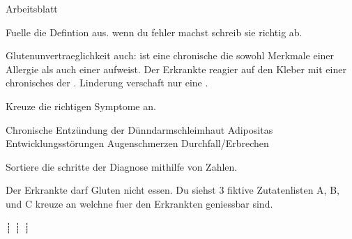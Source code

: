 \documentclass[11pt,twoside,a4paper]{exam}
\begin{document}
\begin{center}
  \huge{Arbeitsblatt}
\end{center}
\begin{center}
\end{center}
\vspace{0.1in}

\begin{questions}
\question Fuelle die Defintion aus. wenn du fehler machst schreib sie richtig ab.

Glutenunvertraeglichkeit auch: \fillin ist eine chronische \fillin die sowohl Merkmale einer Allergie als auch einer \fillin aufweist.
Der Erkrankte reagier \fillin auf den Kleber \fillin mit einer chronisches \fillin der \fillin. Linderung verschaft
nur eine \fillin.



\question
  Kreuze die richtigen Symptome an.
  \begin{checkboxes}
\choice Chronische Entzündung der Dünndarmschleimhaut
\choice Adipositas
\choice Entwicklungsstörungen
\choice Augenschmerzen
\choice Durchfall/Erbrechen
  \end{checkboxes}



  \question Sortiere die schritte der Diagnose mithilfe von Zahlen.
  
  \begin{oneparcheckboxes}
  \end{oneparcheckboxes}


\begin{center}
\end{center}

\vspace{0.1in}

  \question Der Erkrankte darf Gluten nicht essen. Du siehst 3 fiktive Zutatenlisten A, B, und C kreuze an welchne fuer den Erkrankten geniessbar sind.
     \begin{oneparcheckboxes}
     ┊ 
     ┊ 
  ┊    
     \end{oneparcheckboxes}



\end{questions}
\end{document}

